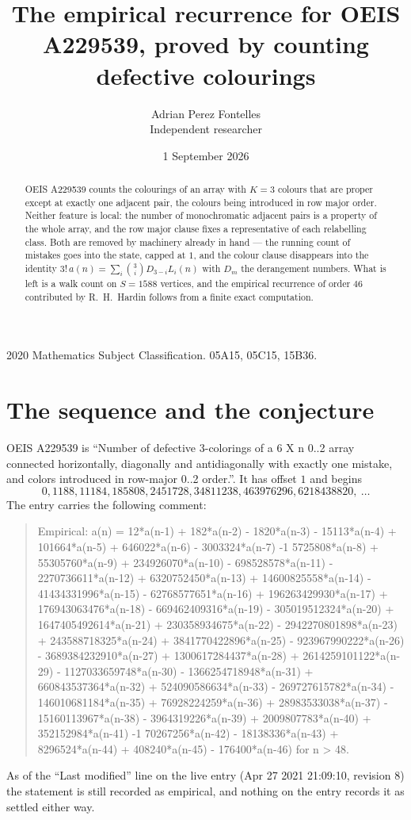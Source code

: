 \documentclass[11pt,a4paper]{article}
\title{The empirical recurrence for OEIS A229539, proved by counting defective colourings}
\author{Adrian Perez Fontelles\\ \small Independent researcher}
\date{1 September 2026}
\theoremstyle{plain}
\theoremstyle{definition}
\begin{document}
\maketitle

\begin{abstract}
OEIS A229539 counts the colourings of an array with $K=3$ colours that are proper except at
exactly one adjacent pair, the colours being introduced in row
major order. Neither feature is local: the number of monochromatic adjacent pairs is a
property of the whole array, and the row major clause fixes a representative of each
relabelling class. Both are removed by machinery already in hand --- the running count of
mistakes goes into the state, capped at $1$, and the colour clause disappears into the
identity $3!\,a(n)=\sum_i\binom{3}{i}D_{3-i}L_i(n)$ with $D_m$ the derangement
numbers. What is left is a walk count on $S=1588$ vertices, and the empirical recurrence of
order $46$ contributed by R.~H.~Hardin follows from a finite exact computation.
\end{abstract}

\noindent\small 2020 Mathematics Subject Classification. 05A15, 05C15, 15B36.\normalsize

\section{The sequence and the conjecture}

OEIS A229539 is ``Number of defective 3-colorings of a 6 X n 0..2 array connected horizontally, diagonally and antidiagonally with exactly one mistake, and colors introduced in row-major 0..2 order.''. It has offset $1$ and begins
\[
0, 1188, 11184, 185808, 2451728, 34811238, 463976296, 6218438820,\ \dots
\]
The entry carries the following comment:
\begin{quote}\small
Empirical: a(n) = 12*a(n-1) + 182*a(n-2) - 1820*a(n-3) - 15113*a(n-4) + 101664*a(n-5) + 646022*a(n-6) - 3003324*a(n-7) -1 5725808*a(n-8) + 55305760*a(n-9) + 234926070*a(n-10) - 698528578*a(n-11) - 2270736611*a(n-12) + 6320752450*a(n-13) + 14600825558*a(n-14) - 41434331996*a(n-15) - 62768577651*a(n-16) + 196263429930*a(n-17) + 176943063476*a(n-18) - 669462409316*a(n-19) - 305019512324*a(n-20) + 1647405492614*a(n-21) + 230358934675*a(n-22) - 2942270801898*a(n-23) + 243588718325*a(n-24) + 3841770422896*a(n-25) - 923967990222*a(n-26) - 3689384232910*a(n-27) + 1300617284437*a(n-28) + 2614259101122*a(n-29) - 1127033659748*a(n-30) - 1366254718948*a(n-31) + 660843537364*a(n-32) + 524090586634*a(n-33) - 269727615782*a(n-34) - 146010681184*a(n-35) + 76928224259*a(n-36) + 28983533038*a(n-37) - 15160113967*a(n-38) - 3964319226*a(n-39) + 2009807783*a(n-40) + 352152984*a(n-41) -1 70267256*a(n-42) - 18138336*a(n-43) + 8296524*a(n-44) + 408240*a(n-45) - 176400*a(n-46) for n > 48.
\end{quote}
As of the ``Last modified'' line on the live entry (Apr 27 2021 21:09:10, revision 8) the statement is
still recorded as empirical, and nothing on the entry records it as settled either way.
\end{document}

